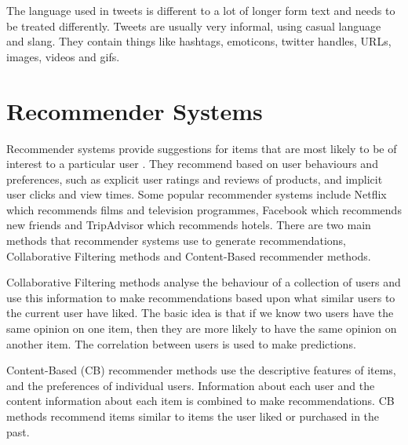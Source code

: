 
The language used in tweets is different to a lot of longer form text and needs to be treated differently. Tweets are usually very informal, using casual language and slang. They contain things like hashtags, emoticons, twitter handles, URLs, images, videos and gifs.

\section{Recommender Systems}
Recommender systems provide suggestions for items that are most likely to be of interest to a particular user \cite{Ricci2015}. They recommend based on user behaviours and preferences, such as explicit user ratings and reviews of products, and implicit user clicks and view times. Some popular recommender systems include Netflix which recommends films and television programmes, Facebook which recommends new friends and TripAdvisor which recommends hotels. There are two main methods that recommender systems use to generate recommendations, Collaborative Filtering methods and Content-Based recommender methods. 

Collaborative Filtering methods analyse the behaviour of a collection of users and use this information to make recommendations based upon what similar users to the current user have liked. The basic idea is that if we know two users have the same opinion on one item, then they are more likely to have the same opinion on another item. The correlation between users is used to make predictions.

Content-Based (CB) recommender methods use the descriptive features of items, and the preferences of individual users. Information about each user and the content information about each item is combined to make recommendations. CB methods recommend items similar to items the user liked or purchased in the past.


